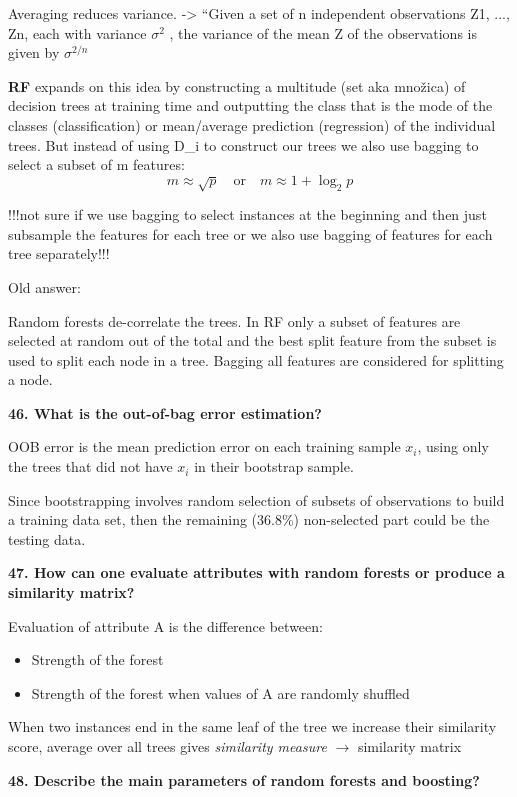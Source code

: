 Averaging reduces variance. -\textgreater{} ``Given a set of n
independent observations Z1, ..., Zn, each with variance $\sigma^2$ , the
variance of the mean Z of the observations is given by
$\sigma^{2/n}$

\textbf{RF} expands on this idea by constructing a multitude (set aka
množica) of decision trees at training time and outputting the class
that is the mode of the classes (classification) or mean/average
prediction (regression) of the individual trees. But instead of using
D\_i to construct our trees we also use bagging to select a subset of m
features:
\[ m \approx \sqrt{p} \quad \text{or} \quad m \approx 1 + \log_2 p \]

!!!not sure if we use bagging to select instances at the beginning and
then just subsample the features for each tree or we also use bagging of
features for each tree separately!!!

Old answer:

Random forests de-correlate the trees. In RF only a subset of features
are selected at random out of the total and the best split feature from
the subset is used to split each node in a tree. Bagging all features
are considered for splitting a node.

\textbf{46. What is the out-of-bag error estimation?}

OOB error is the mean prediction error on each training sample $x_i$, using
only the trees that did not have $x_i$ in their bootstrap sample.

Since bootstrapping involves random selection of subsets of observations
to build a training data set, then the remaining (36.8\%) non-selected
part could be the testing data.

\textbf{47. How can one evaluate attributes with random forests or
produce a similarity matrix?}

Evaluation of attribute A is the difference between:

\begin{itemize}
\item Strength of the forest
\item Strength of the forest when values of A are randomly shuffled
\end{itemize}

When two instances end in the same leaf of the tree we increase their
similarity score, average over all trees gives \emph{similarity measure}
$\rightarrow$ similarity matrix

\textbf{48. Describe the main parameters of random forests and
boosting?}

